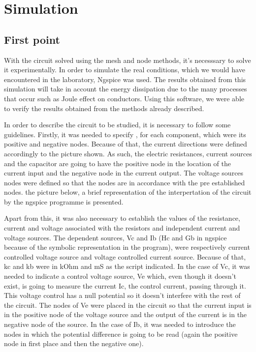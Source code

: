 \section{Simulation}
\label{sec:simulation}

\subsection{First point}
\label{ssec:1S}
\par  With the circuit solved using the mesh and node methods, it's necesssary to solve it experimentally. In order to simulate the real conditions, which we would have encountered in the laboratory, Ngspice was used. The results obtained from this simulation will take in account the energy dissipation due to the many processes that occur such as Joule effect on conductors. Using this software, we were able to verify the results obtained from the methods already described. 

\par  In order to describe the circuit to be studied, it is necessary to follow some guidelines. Firstly, it was needed to specify , for each component, which were its positive and negative nodes. Because of that, the current directions were defined accordingly to the picture shown. As such, the electric resistances, current sources and the capacitor are going to have the positive node in the location of the current input and the negative node in the current output. The voltage sources nodes were defined so that the nodes are in accordance with the pre established nodes.  the picture below, a brief representation of the interpertation of the circuit by the ngspice programme is presented.

\par Apart from this, it was also necessary to establish the values of the resistance, current and voltage associated with the resistors and independent current and voltage sources. The dependent sources, Vc and Ib (Hc and Gb in ngspice because of the symbolic representation in the program), were respectively current controlled voltage source and voltage controlled current source. Because of that, kc and kb were in kOhm and mS as the script indicated. In the case of Vc, it was needed to indicate a control voltage source, Ve which, even though it doesn't exist, is going to measure the current Ic, the control current, passing through it. This voltage control has a null potential so it doesn't interfere with the rest of the circuit. The nodes of Ve were placed in the circuit so that the current input is in the positive node of the voltage source and the output of the current is in the negative node of the source.  In the case of Ib, it was needed to introduce the nodes in which the potential difference is going to be read (again the positive node in first place and then the negative one).

